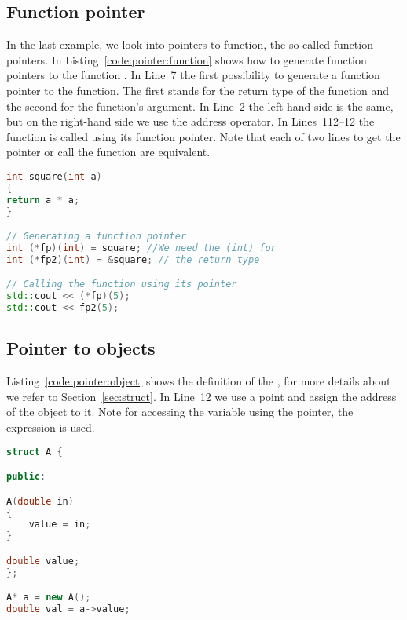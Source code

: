 \subsection*{Function pointer}
In the last example, we look into pointers to function, the so-called function pointers. In Listing~\ref{code:pointer:function} shows how to generate function pointers to the function . In Line~7 the first possibility to generate a function pointer to the  function. The first  stands for the return type of the function and the second  for the function's argument. In Line~2 the left-hand side is the same, but on the right-hand side we use the address operator. In Lines~112--12 the function is called using its function pointer. Note that each of two lines to get the pointer or call the function are equivalent. 


\begin{lstlisting}[language=c++,caption={Example for function pointers.
\label{code:pointer:function}},float,floatplacement=tb]
int square(int a)
{
return a * a;
}

// Generating a function pointer
int (*fp)(int) = square; //We need the (int) for
int (*fp2)(int) = &square; // the return type

// Calling the function using its pointer
std::cout << (*fp)(5);
std::cout << fp2(5);

\end{lstlisting}

\subsection*{Pointer to objects}
Listing~\ref{code:pointer:object} shows the definition of the , for more details about  we refer to Section~\ref{sec:struct}. In Line~12 we use a point  and assign the address of the  object to it. Note for accessing the variable  using the pointer, the expression \cpp{->} is used. 

\begin{lstlisting}[language=c++,caption={Example for pointers to objects.
\label{code:pointer:object}},float,floatplacement=tb]
struct A {

public: 

A(double in)
{
	value = in;
}

double value;
};

A* a = new A();
double val = a->value;
\end{lstlisting}



